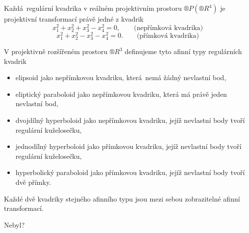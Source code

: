 \documentclass[12pt]{article}					%
\begin{document}
\begin{definice}
	Každá regulární kvadrika v reálném projektivním prostoru $®P(®R^4)$ je projektivní transformací právě jedné z kvadrik
	$$ x_1^2 + x_2^2 + x_3^2 - x_4^2 = 0, \qquad \text{(nepřímková kvadrika)} $$
	$$ x_1^2 + x_2^2 - x_3^2 - x_4^2 = 0. \qquad \text{(přímková kvadrika)} $$

	V projektivně rozšířeném prostoru $®R^3$ definujeme tyto afinní typy regulárních kvadrik

	\begin{itemize}
		\item elipsoid jako nepřímkovou kvadriku, která nemá žádný nevlastní bod,
		\item eliptický paraboloid jako nepřímkovou kvadriku, která má právě jeden nevlastní bod,
		\item dvojdílný hyperboloid jako nepřímkovou kvadriku, jejíž nevlastní body tvoří regulární kuželosečku,
		\item jednodílný hyperboloid jako přímkovou kvadriku, jejíž nevlastní body tvoří regulární kuželosečku,
		\item hyperbolický paraboloid jako přímkovou kvadriku, jejíž nevlastní body tvoří dvě přímky.
	\end{itemize}

	Každé dvě kvadriky stejného afinního typu jsou mezi sebou zobrazitelné afinní transformací.

	\begin{dukazin}
		Nebyl?
	\end{dukazin}
\end{definice}
\end{document}
